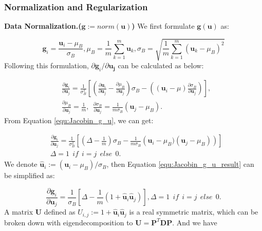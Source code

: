 \documentclass[10pt,journal,compsoc]{IEEEtran}
\begin{document}
\subsubsection{Normalization and Regularization}

\textbf{Data Normalization.($\mathbf{g}:=norm(\mathbf{u})$)} We first formulate $\mathbf{g}(\mathbf{u})$ as:

\begin{equation}
    \mathbf{g}_i = \frac{\mathbf{u}_i-\mu_B}{\sigma_B}, \mu_B = \frac{1}{m}\sum_{k=1}^m \mathbf{u}_k, \sigma_B = \sqrt{\frac{1}{m}\sum_{k=1}^m (\mathbf{u}_k - \mu_B)^2}
\end{equation}
Following this formulation, $\partial \mathbf{g}_i/\partial \mathbf{u_j}$ can be calculated as below:

\begin{equation}
    \begin{split}
        & \frac{\partial \mathbf{g}_i}{\partial \mathbf{u}_j} = \frac{1}{\sigma_B^2}\left[\left( \frac{\partial \mathbf{u}_i}{\partial \mathbf{u}_j} - \frac{\partial \mu_B}{\partial \mathbf{u}_j}\right) \sigma_B - \left((\mathbf{u}_i - \mu)\frac{\partial \sigma_B}{\partial \mathbf{u}_j}\right) \right],\\
        & \frac{\partial \mu_B}{\partial \mathbf{u}_j} = \frac{1}{m},~~\frac{\partial\sigma_B}{\partial\mathbf{u}_j} = \frac{1}{m\sigma_B}(\mathbf{u}_j-\mu_B).
    \end{split}
\label{equ:Jacobin_g_u}
\end{equation}
From Equation \eqref{equ:Jacobin_g_u}, we can get:

\begin{equation}
\begin{split}
    & \frac{\partial \mathbf{g}_i}{\partial \mathbf{u}_j} = \frac{1}{\sigma_B^2}\left[\left( \Delta - \frac{1}{m}\right) \sigma_B - \frac{1}{m\sigma_B}\left(\mathbf{u}_i - \mu_B)(\mathbf{u}_j - \mu_B)\right) \right]\\
    & \Delta = 1 ~~ if~~i=j~~else~~0.
\end{split}
\label{equ:Jacobin_g_u_result}
\end{equation}
We denote $\hat{\mathbf{u}}_i := (\mathbf{u}_i - \mu_B)/\sigma_B$, then Equation \eqref{equ:Jacobin_g_u_result} can be simplified as:

\begin{equation}
    \frac{\partial \mathbf{g}_i}{\partial \mathbf{u}_j} = \frac{1}{\sigma_B}\left[ \Delta - \frac{1}{m}(1 + \hat{\mathbf{u}}_i\hat{\mathbf{u}}_j) \right],\Delta = 1 ~~ if~~i=j~~else~~0.
\label{equ:Jacobin_g_u_result_simple}
\end{equation}
A matrix $\mathbf{U}$ defined as $U_{i,j} := 1 + \hat{\mathbf{u}}_i\hat{\mathbf{u}}_j$ is a real symmetric matrix, which can be broken down with eigendecomposition to $\mathbf{U} = \mathbf{P}^T\mathbf{D}\mathbf{P}$. And we have
\end{document}
